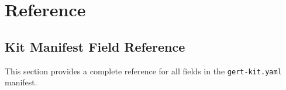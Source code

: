 
\chapter{Reference}
\label{ch:reference}

\section{Kit Manifest Field Reference}
\label{sec:manifest-reference}

This section provides a complete reference for all fields in the
\texttt{gert-kit.yaml} manifest.

